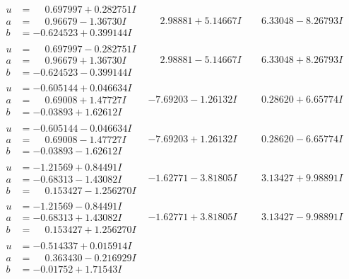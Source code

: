 \documentclass[1p]{elsarticle_modified}
\theoremstyle{definition}
\begin{document}
$$\begin{array}{c|c|c}
\begin{aligned}
u &= \phantom{-}0.697997 + 0.282751 I \\
a &= \phantom{-}0.96679 - 1.36730 I \\
b &= -0.624523 + 0.399144 I\end{aligned}
 & \phantom{-}2.98881 + 5.14667 I & \phantom{-}6.33048 - 8.26793 I \\ \hline\begin{aligned}
u &= \phantom{-}0.697997 - 0.282751 I \\
a &= \phantom{-}0.96679 + 1.36730 I \\
b &= -0.624523 - 0.399144 I\end{aligned}
 & \phantom{-}2.98881 - 5.14667 I & \phantom{-}6.33048 + 8.26793 I \\ \hline\begin{aligned}
u &= -0.605144 + 0.046634 I \\
a &= \phantom{-}0.69008 + 1.47727 I \\
b &= -0.03893 + 1.62612 I\end{aligned}
 & -7.69203 - 1.26132 I & \phantom{-}0.28620 + 6.65774 I \\ \hline\begin{aligned}
u &= -0.605144 - 0.046634 I \\
a &= \phantom{-}0.69008 - 1.47727 I \\
b &= -0.03893 - 1.62612 I\end{aligned}
 & -7.69203 + 1.26132 I & \phantom{-}0.28620 - 6.65774 I \\ \hline\begin{aligned}
u &= -1.21569 + 0.84491 I \\
a &= -0.68313 - 1.43082 I \\
b &= \phantom{-}0.153427 - 1.256270 I\end{aligned}
 & -1.62771 - 3.81805 I & \phantom{-}3.13427 + 9.98891 I \\ \hline\begin{aligned}
u &= -1.21569 - 0.84491 I \\
a &= -0.68313 + 1.43082 I \\
b &= \phantom{-}0.153427 + 1.256270 I\end{aligned}
 & -1.62771 + 3.81805 I & \phantom{-}3.13427 - 9.98891 I \\ \hline\begin{aligned}
u &= -0.514337 + 0.015914 I \\
a &= \phantom{-}0.363430 - 0.216929 I \\
b &= -0.01752 + 1.71543 I\end{aligned}

\end{array}$$
\end{document}
